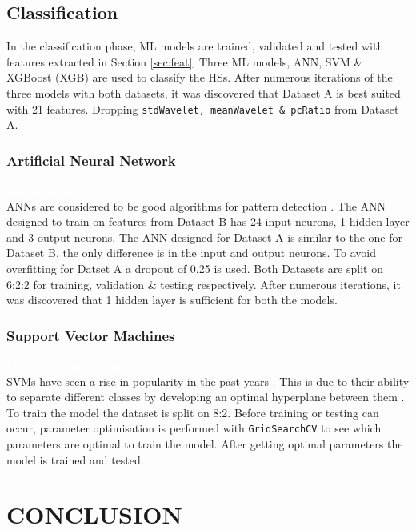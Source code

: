 \documentclass[10pt,twocolumn]{witseiepaper}
\begin{document}
\subsection{Classification}
In the classification phase, ML models are trained, validated and tested with features extracted in Section \ref{sec:feat}. Three ML models, ANN, SVM \& XGBoost (XGB) are used to classify the HSs. After numerous iterations of the three models with both datasets, it was discovered that Dataset A is best suited with 21 features. Dropping \texttt{stdWavelet, meanWavelet \& pcRatio} from Dataset A.

\subsubsection{Artificial Neural Network}
\textcolor{white}{O nkisa botaleng..}\\
ANNs are considered to be good algorithms for pattern detection \cite{3}. The ANN designed to train on features from Dataset B has 24 input neurons, 1 hidden layer and 3 output neurons. The ANN designed for Dataset A is similar to the one for Dataset B, the only difference is in the input and output neurons. To avoid overfitting for Datset A a dropout of 0.25 is used. Both Datasets are split on 6:2:2 for training, validation \& testing respectively. After numerous iterations, it was discovered that 1 hidden layer is sufficient for both the models.

\subsubsection{Support Vector Machines}
\textcolor{white}{Meetseng a mphedisang..}\\
SVMs have seen a rise in popularity in the past years \cite{5}. This is due to their ability to separate different classes by developing an optimal hyperplane between them \cite{22}. To train the model the dataset is split on 8:2. Before training or testing can occur, parameter optimisation is performed with \texttt{GridSearchCV} to see which parameters are optimal to train the model. After getting optimal parameters the model is trained and tested.



\newpage
\section{CONCLUSION}
\end{document}
